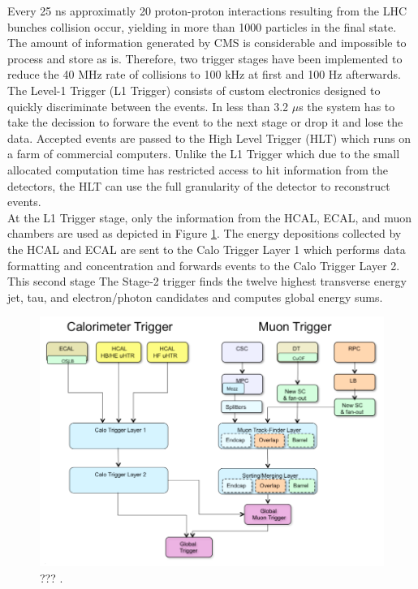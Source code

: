     Every 25 ns approximatly 20 proton-proton interactions resulting from the LHC bunches collision occur, yielding in more than 1000 particles in the final state. The amount of information generated by CMS is considerable and impossible to process and store as is. Therefore, two trigger stages have been implemented to reduce the 40 MHz rate of collisions to 100 kHz at first and 100 Hz afterwards. The Level-1 Trigger (L1 Trigger) consists of custom electronics designed to quickly discriminate between the events. In less than 3.2 $\mu$s the system has to take the decission to forware the event to the next stage or drop it and lose the data. Accepted events are passed to the High Level Trigger (HLT) which runs on a farm of commercial computers. Unlike the L1 Trigger which due to the small allocated computation time has restricted access to hit information from the detectors, the HLT can use the full granularity of the detector to reconstruct events. \\

    At the L1 Trigger stage, only the information from the HCAL, ECAL, and muon chambers are used as depicted in Figure \ref{fig:I-3-l1}. The energy depositions collected by the HCAL and ECAL are sent to the Calo Trigger Layer 1 which performs data formatting and concentration and forwards events to the Calo Trigger Layer 2. This second stage The Stage-2 trigger finds the twelve highest transverse energy jet, tau, and electron/photon candidates and computes global energy sums. \\

    \begin{figure}[h!]
      \centering
      \includegraphics[width=\textwidth]{img/I-3-cms/l1.png}
      \caption{??? \cite{1748-0221-3-08-S08004}.}
      \label{fig:I-3-l1}
    \end{figure}

